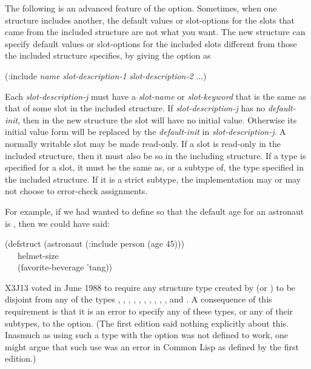 \begin{flushdesc}
The following is an advanced feature of the  option.
Sometimes, when one structure includes another, the default values or
slot-options for the slots that came from the included structure are not
what you want.  The new structure can specify default values or
slot-options for the included slots different from those the included
structure specifies, by giving the  option as
\begin{lisp}
(:include \emph{name} \emph{slot-description-1} \emph{slot-description-2} ...)
\end{lisp}
Each \emph{slot-description-j} must have a \emph{slot-name} or \emph{slot-keyword} that is the same
as that of some slot in the included structure.
If \emph{slot-description-j} has no \emph{default-init},
then in the new structure the slot will have no initial
value.  Otherwise its initial value form will be replaced by
the \emph{default-init} in \emph{slot-description-j}.
A normally writable slot may be made read-only.
If a slot is read-only in the included structure, then it
must also be so in the including structure.
If a type is specified for a slot, it must be the same as, or a subtype of, the
type specified in the included structure.  If it is a strict subtype,
the implementation may or may not choose to error-check assignments.

For example, if we had wanted to define  so that the
default age for an astronaut is , then we could have said:
\begin{lisp}
(defstruct (astronaut (:include person (age 45))) \\
~~~helmet-size \\
~~~(favorite-beverage 'tang))
\end{lisp}

\begin{new}
X3J13 voted in June 1988
to require any structure type created by 
(or ) to be disjoint from any of the types
, , , , ,
, , , ,
, and .  A consequence of this requirement
is that it is an error to specify any of these types, or any of their
subtypes, to the   option.
(The first edition said nothing explicitly about this.
Inasmuch as using such a type with the  option was
not defined to work, one might argue that such use was an error
in Common Lisp as defined by the first edition.)
\end{new}


\end{flushdesc}
